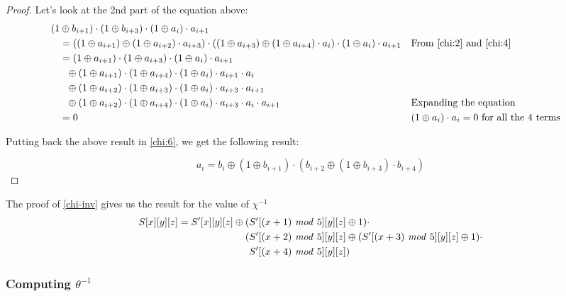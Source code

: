 \documentclass[10pt,twoside]{article}
\begin{document}
\begin{proof}
  Let's look at the 2nd part of the equation above:
  \begin{align*}
    (1&\oplus b_{i+1})\cdot(1\oplus b_{i+3})\cdot(1 \oplus a_i)\cdot a_{i+1} \\
    &= ((1 \oplus a_{i+1}) \oplus (1 \oplus a_{i+2})\cdot a_{i+3})\cdot((1\oplus a_{i+3}) \oplus (1 \oplus a_{i+4})\cdot a_i)\cdot(1 \oplus a_i)\cdot a_{i+1} && \text{From \cref{chi:2} and \cref{chi:4}} \\
    &= (1 \oplus a_{i+1})\cdot(1\oplus a_{i+3})\cdot(1 \oplus a_i)\cdot a_{i+1} \\
    &\ \ \oplus (1 \oplus a_{i+1})\cdot(1 \oplus a_{i+4})\cdot(1 \oplus a_i)\cdot a_{i+1} \cdot a_i \\
    &\ \ \oplus (1 \oplus a_{i+2})\cdot(1\oplus a_{i+3})\cdot(1 \oplus a_i)\cdot a_{i+3} \cdot a_{i+1} \\
    &\ \ \oplus (1 \oplus a_{i+2})\cdot(1 \oplus a_{i+4})\cdot(1 \oplus a_i)\cdot a_{i+3} \cdot a_i \cdot a_{i+1} && \text{Expanding the equation} \\
    &= 0 && \text{$(1 \oplus a_i)\cdot a_i = 0$ for all the $4$ terms}
  \end{align*}

  Putting back the above result in \cref{chi:6}, we get the following result:

  $$a_i = b_i \oplus (1 \oplus b_{i+1})\cdot (b_{i+2} \oplus (1 \oplus b_{i+3})\cdot b_{i+4})$$
\end{proof}

The proof of \cref{chi-inv} gives us the result for the value of $\chi^{-1}$
\begin{equation}
  \begin{split}
  S[x][y][z] = S'[x][y][z] \oplus (&S'[(x+1)\ \text{\textit{mod}}\ 5][y][z] \oplus 1)\cdot \\
                                  (&S'[(x+2)\ \text{\textit{mod}}\ 5][y][z] \oplus (S'[(x+3)\ \text{\textit{mod}}\ 5][y][z] \oplus 1)\cdot \\
                                  &S'[(x+4)\ \text{\textit{mod}}\ 5][y][z]) \\
  \end{split}
\end{equation}

\subsubsection{Computing $\theta^{-1}$}
\end{document}
